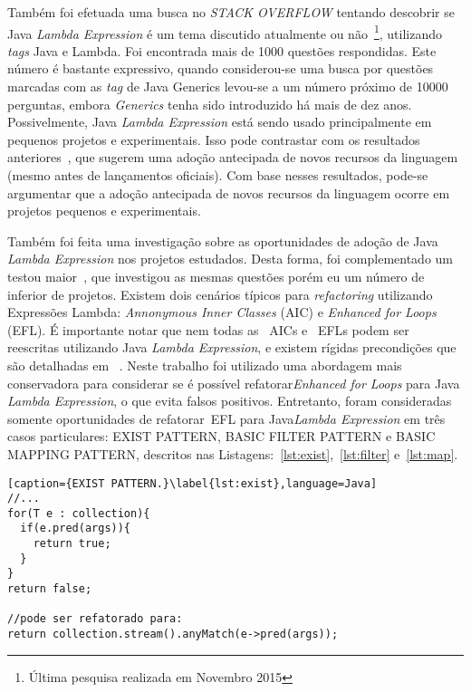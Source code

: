 Também foi efetuada uma busca no \textit{STACK OVERFLOW} tentando descobrir se Java\textit{ Lambda Expression} é um tema discutido atualmente ou não~\footnote{Última pesquisa realizada em Novembro 2015}, utilizando \textit{tags} Java e Lambda. Foi encontrada mais de \num{1000} questões respondidas. Este número é bastante expressivo, quando considerou-se uma busca por questões marcadas com as \textit{tag} de Java Generics levou-se a um número próximo de \num{10000} perguntas, embora \textit{Generics} tenha sido introduzido há mais de dez anos. Possivelmente, Java\textit{ Lambda Expression} está sendo usado principalmente em pequenos projetos e experimentais. Isso pode contrastar com os resultados anteriores~\cite{Dyer:ACM2014}, que sugerem uma adoção antecipada de novos recursos da linguagem (mesmo antes de lançamentos oficiais). Com base nesses resultados, pode-se argumentar que a adoção antecipada de novos recursos da linguagem ocorre em projetos pequenos e experimentais.

Também foi feita uma investigação sobre as oportunidades de adoção de Java\textit{ Lambda Expression} nos projetos estudados. Desta forma, foi complementado um testou maior~\cite{gyori2013crossing},  que investigou as mesmas questões porém eu um número de  inferior de projetos. Existem dois cenários típicos para \textit{refactoring} utilizando Expressões Lambda: \textit{Annonymous Inner Classes} (\acs{AIC}) e \textit{Enhanced for Loops} (\acs{EFL}). É importante notar que nem todas as ~\acs{AIC}s e ~\acs{EFL}s podem ser reescritas utilizando Java\textit{ Lambda Expression}, e existem rígidas precondições que são detalhadas em ~\cite{gyori2013crossing}. Neste trabalho foi utilizado uma abordagem mais conservadora para considerar se é possível refatorar\textit{Enhanced for Loops} para Java\textit{ Lambda Expression}, o que evita falsos positivos.  Entretanto, foram consideradas somente 
oportunidades de refatorar~\acs{EFL} para Java\textit{Lambda Expression} em tr\^{e}s 
casos particulares: \textsc{EXIST PATTERN}, \textsc{BASIC FILTER PATTERN} e 
\textsc{BASIC MAPPING PATTERN}, descritos nas 
Listagens:~\ref{lst:exist},~\ref{lst:filter} e~\ref{lst:map}.

\begin{lstlisting}[caption={EXIST PATTERN.}\label{lst:exist},language=Java]
//...
for(T e : collection){
  if(e.pred(args)){
    return true;
  }
}
return false;

//pode ser refatorado para:
return collection.stream().anyMatch(e->pred(args));
\end{lstlisting}


